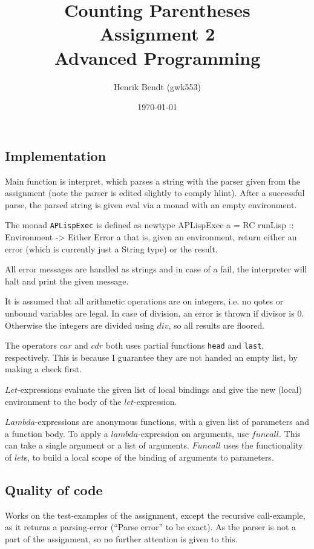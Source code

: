 \documentclass[a4paper, 10pt]{article}
\author{Henrik Bendt (gwk553)}
\title{Counting Parentheses\\Assignment 2\\Advanced Programming}
\date{\today}
\renewenvironment{verbatim}{}{}
\begin{document}
\maketitle
\pagebreak

\subsection*{Implementation}
Main function is interpret, which parses a string with the parser given from the assignment (note the parser is edited slightly to comply hlint). After a successful parse, the parsed string is given eval via a monad with an empty environment. 

The monad \texttt{APLispExec} is defined as
\begin{verbatim}
\begin{verbatim}
newtype APLispExec a = RC { runLisp :: Environment -> Either Error a}
\end{verbatim}
\end{verbatim}
that is, given an environment, return either an error (which is currently just a String type) or the result.

All error messages are handled as strings and in case of a fail, the interpreter will halt and print the given message.

It is assumed that all arithmetic operations are on integers, i.e. no qotes or unbound variables are legal. In case of division, an error is thrown if divisor is 0. Otherwise the integers are divided using $div$, so all results are floored. 

The operators $car$ and $cdr$ both uses partial functions \texttt{head} and \texttt{last}, respectively. This is because I guarantee they are not handed an empty list, by making a check first. 

$Let$-expressions evaluate the given list of local bindings and give the new (local) environment to the body of the $let$-expression.

$Lambda$-expressions are anonymous functions, with a given list of parameters and a function body. To apply a $lambda$-expression on arguments, use $funcall$. This can take a single argument or a list of arguments. $Funcall$ uses the functionality of $let$s, to build a local scope of the binding of arguments to parameters.

\subsection*{Quality of code}
Works on the test-examples of the assignment, except the recursive call-example, as it returns a parsing-error (``Parse error'' to be exact). As the parser is not a part of the assignment, so no further attention is given to this.
\end{document}
